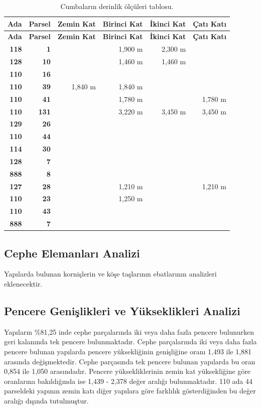 \documentclass[12pt,turkish,a4paperpaper,]{report}
\begin{document}
\begin{longtable}[]{@{}rrrrrr@{}}
\caption{Cumbaların derinlik ölçüleri tablosu.}\tabularnewline
\toprule
\textbf{Ada} & \textbf{Parsel} & \textbf{Zemin Kat} & \textbf{Birinci
Kat} & \textbf{İkinci Kat} & \textbf{Çatı Katı}\tabularnewline
\midrule
\endfirsthead
\toprule
\textbf{Ada} & \textbf{Parsel} & \textbf{Zemin Kat} & \textbf{Birinci
Kat} & \textbf{İkinci Kat} & \textbf{Çatı Katı}\tabularnewline
\midrule
\endhead
\textbf{118} & \textbf{1} & & 1,900 m & 2,300 m &\tabularnewline
\textbf{128} & \textbf{10} & & 1,460 m & 1,460 m &\tabularnewline
\textbf{110} & \textbf{16} & & & &\tabularnewline
\textbf{110} & \textbf{39} & 1,840 m & 1,840 m & &\tabularnewline
\textbf{110} & \textbf{41} & & 1,780 m & & 1,780 m\tabularnewline
\textbf{110} & \textbf{131} & & 3,220 m & 3,450 m & 3,450
m\tabularnewline
\textbf{129} & \textbf{26} & & & &\tabularnewline
\textbf{110} & \textbf{44} & & & &\tabularnewline
\textbf{114} & \textbf{30} & & & &\tabularnewline
\textbf{128} & \textbf{7} & & & &\tabularnewline
\textbf{888} & \textbf{8} & & & &\tabularnewline
\textbf{127} & \textbf{28} & & 1,210 m & & 1,210 m\tabularnewline
\textbf{110} & \textbf{23} & & 1,250 m & &\tabularnewline
\textbf{110} & \textbf{43} & & & &\tabularnewline
\textbf{888} & \textbf{7} & & & &\tabularnewline
\bottomrule
\end{longtable}

\hypertarget{cephe-elemanlarux131-analizi}{%
\subsection{Cephe Elemanları
Analizi}\label{cephe-elemanlarux131-analizi}}

Yapılarda bulunan kornişlerin ve köşe taşlarının ebatlarının analizleri
eklenecektir.

\hypertarget{pencere-geniux15flikleri-ve-yuxfckseklikleri-analizi}{%
\subsection{Pencere Genişlikleri ve Yükseklikleri
Analizi}\label{pencere-geniux15flikleri-ve-yuxfckseklikleri-analizi}}

Yapıların \%81,25 inde cephe parçalarında iki veya daha fazla pencere
bulunurken geri kalanında tek pencere bulunmaktadır. Cephe parçalarında
iki veya daha fazla pencere bulunan yapılarda pencere yüksekliğinin
genişliğine oranı 1,493 ile 1,881 arasında değişmektedir. Cephe
parçasında tek pencere bulunan yapılarda bu oran 0,854 ile 1,050
arasındadır. Pencere yüksekliklerinin zemin kat yüksekliğine göre
oranlarına bakıldığında ise 1,439 - 2,378 değer aralığı bulunmaktadır.
110 ada 44 parseldeki yapının zemin katı diğer yapılara göre farklılık
gösterdiğinden bu değer aralığı dışında tutulmuştur.
\end{document}
